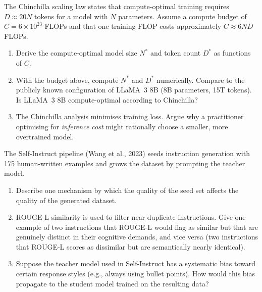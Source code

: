 \begin{exercise}
\label{ex:chinchilla}
The Chinchilla scaling law states that compute-optimal training requires $D \approx 20N$ tokens for a model with $N$ parameters. Assume a compute budget of $C = 6 \times 10^{23}$ FLOPs and that one training FLOP costs approximately $C \approx 6ND$ FLOPs.
\begin{enumerate}
  \item Derive the compute-optimal model size $N^*$ and token count $D^*$ as functions of $C$.
  \item With the budget above, compute $N^*$ and $D^*$ numerically. Compare to the publicly known configuration of LLaMA~3 8B (8B parameters, 15T tokens). Is LLaMA~3 8B compute-optimal according to Chinchilla?
  \item The Chinchilla analysis minimises training loss. Argue why a practitioner optimising for \emph{inference cost} might rationally choose a smaller, more overtrained model.
\end{enumerate}
\end{exercise}

\begin{exercise}
\label{ex:self-instruct}
The Self-Instruct pipeline (Wang et al., 2023) seeds instruction generation with 175 human-written examples and grows the dataset by prompting the teacher model.
\begin{enumerate}
  \item Describe one mechanism by which the quality of the seed set affects the quality of the generated dataset.
  \item ROUGE-L similarity is used to filter near-duplicate instructions. Give one example of two instructions that ROUGE-L would flag as similar but that are genuinely distinct in their cognitive demands, and vice versa (two instructions that ROUGE-L scores as dissimilar but are semantically nearly identical).
  \item Suppose the teacher model used in Self-Instruct has a systematic bias toward certain response styles (e.g., always using bullet points). How would this bias propagate to the student model trained on the resulting data?
\end{enumerate}
\end{exercise}

